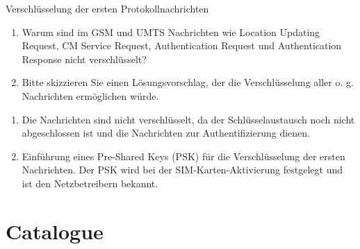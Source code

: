 \documentclass{article}
\begin{document}
\begin{exercise}{Verschlüsselung der ersten Protokollnachrichten}
  \begin{enumerate}
    \item Warum sind im GSM und UMTS Nachrichten wie Location Updating Request, CM Service Request, Authentication Request und Authentication Response nicht verschlüsselt?
    \item Bitte skizzieren Sie einen Lösungsvorschlag, der die Verschlüsselung aller o. g. Nachrichten ermöglichen würde.
  \end{enumerate}
 
   \begin{solution}
     \begin{enumerate}
      \item Die Nachrichten sind nicht verschlüsselt, da der Schlüsselaustausch noch nicht abgeschlossen ist und die Nachrichten zur Authentifizierung dienen.
      \item Einführung eines Pre-Shared Keys (PSK) für die Verschlüsselung der ersten Nachrichten. Der PSK wird bei der SIM-Karten-Aktivierung festgelegt und ist den Netzbetreibern bekannt.
     \end{enumerate}
   \end{solution}
 \end{exercise}
 


%

%

%



\section{Catalogue}
\end{document}
